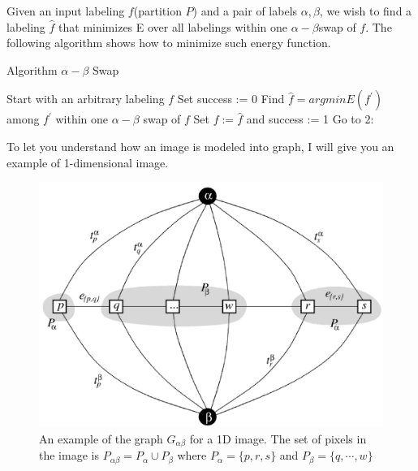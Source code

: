 \documentclass[openany]{memoir}
\begin{document}
Given an input labeling $f$(partition $P$) and a pair of labels $\alpha,\beta$, we wish to find a labeling $\hat{f}$ that minimizes E over all labelings within one $\alpha - \beta$swap of $f$. The following algorithm shows how to minimize such energy function.

\begin{algorithm}
\caption{Algorithm $\alpha - \beta$ Swap}
\begin{algorithmic}[1]
\STATE Start with an arbitrary labeling $f$
\STATE Set success := 0
\STATE Find $\hat{f} = argminE(f^{'})$ among $f^{'}$ within one $\alpha - \beta$ swap of $f$
\STATE Set $f := \hat{f}$ and success := 1
\ENDIF
\ENDFOR
{}
\STATE Go to 2:
\ENDIF
\end{algorithmic}
\end{algorithm}

To let you understand how an image is modeled into graph, I will give you an example of 1-dimensional image.

\clearpage

\begin{figure}
\includegraphics[width=\textwidth]{./graph.png}
\caption{An example of the graph $G_{\alpha\beta}$ for a 1D image. The set of pixels in the image is $P_{\alpha\beta}=P_{\alpha} \cup P_{\beta}$ where $P_{\alpha}=\{p,r,s\}$ and $P_{\beta}=\{q,\cdots,w\}$}
\end{figure}
\end{document}
